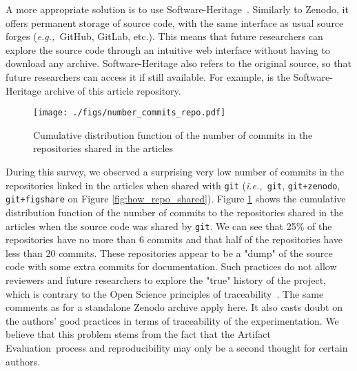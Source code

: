 \documentclass[sigconf,natbib=false]{acmart}
\newcommand{\ie}{\emph{i.e.,}}
\newcommand{\eg}{\emph{e.g.,}}
\newcommand{\aeval}{Artifact Evaluation}
\newcommand{\todo}[1]{{\color{red}{TODO: #1}}}
\begin{document}
A more appropriate solution is to use Software-Heritage\ \cite{swheritage, di2017software}.
Similarly to Zenodo, it offers permanent storage of source code, with the same interface as usual source forges (\eg\ GitHub, GitLab, etc.).
This means that future researchers can explore the source code through an intuitive web interface without having to download any archive.
Software-Heritage also refers to the original source, so that future researchers can access it if still available.
For example, \cite{artefact-lifetime} is the Software-Heritage archive of this article repository.


\begin{figure}
  \centering
  \texttt{[image: ./figs/number\_commits\_repo.pdf]}
  \caption{Cumulative distribution function of the number of commits in the repositories shared in the articles}\label{fig:number_commits_repo}
\end{figure}

During this survey, we observed a surprising very low number of commits in the repositories linked in the articles when shared with \texttt{git} (\ie\ \texttt{git}, \texttt{git+zenodo}, \texttt{git+figshare} on Figure \ref{fig:how_repo_shared}).
Figure \ref{fig:number_commits_repo} shows the cumulative distribution function of the number of commits to the repositories shared in the articles when the source code was shared by \texttt{git}.
We can see that 25\% of the repositories have no more than 6 commits and that half of the repositories have less than 20 commits.
These repositories appear to be a "dump" of the source code with some extra commits for documentation.
Such practices do not allow reviewers and future researchers to explore the "true" history of the project, which is contrary to the Open Science principles of traceability\ \cite{openscience_unesco}.
The same comments as for a standalone Zenodo archive apply here.
It also casts doubt on the authors' good practices in terms of traceability of the experimentation.
We believe that this problem stems from the fact that the \aeval\ process and reproducibility may only be a second thought for certain authors.
\end{document}
